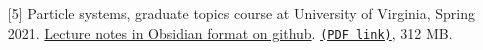 \begin{enumerate}
\item[{[5]}]
Particle systems, graduate topics course at University of Virginia, Spring 2021. \href{https://github.com/lenis2000/HTML_ParticleSysS21}{Lecture notes in Obsidian format on github}. \href{https://storage.lpetrov.cc/papers/lec05-IPS.pdf}{\texttt{(PDF link)}}, 312 MB.


































\end{enumerate}
